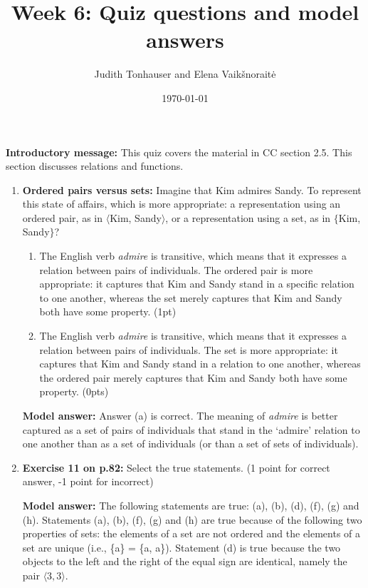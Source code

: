 \documentclass[a4,11pt]{article}
\title{Week 6: Quiz questions and model answers}
\author{Judith Tonhauser and Elena Vaik\v snorait\.{e} }
\date{\today}
\begin{document}
\maketitle

{\bf Introductory message:} This quiz covers the material in CC section 2.5. This section discusses relations and functions.

\begin{enumerate}[leftmargin = 12pt]

\item {\bf Ordered pairs versus sets:} Imagine that Kim admires Sandy. To represent this state of affairs, which is more appropriate: a representation using an ordered pair, as in $\langle$Kim, Sandy$\rangle$, or a representation using a set, as in $\{$Kim, Sandy$\}$?

 \begin{enumerate}[noitemsep]
        \item The English verb {\em admire} is transitive, which means that it expresses a relation between pairs of individuals. The ordered pair is more appropriate: it captures that Kim and Sandy stand in a specific relation to one another, whereas the set merely captures that Kim and Sandy both have some property. (1pt)
        
        \item The English verb {\em admire} is transitive, which means that it expresses a relation between pairs of individuals. The set is more appropriate: it captures that Kim and Sandy stand in a relation to one another, whereas the ordered pair merely captures that Kim and Sandy both have some property. (0pts)
\end{enumerate}

{\bf Model answer:} Answer (a) is correct. The meaning of {\em admire} is better captured as a set of pairs of individuals that stand in the `admire' relation to one another than as a set of individuals (or than a set of sets of individuals).

\item {\bf Exercise 11 on p.82:} Select the true statements. (1 point for correct answer, -1 point for incorrect)

{\bf Model answer:}  The following statements are true: (a), (b), (d), (f), (g) and (h). Statements (a), (b), (f), (g) and (h) are true because of the following two properties of sets: the elements of a set are not ordered and the elements of a set are unique (i.e., \{a\} = \{a, a\}). Statement (d) is true because the two objects to the left and the right of the equal sign are identical, namely the pair $\langle 3,3 \rangle$. 


\end{enumerate}
\end{document}
